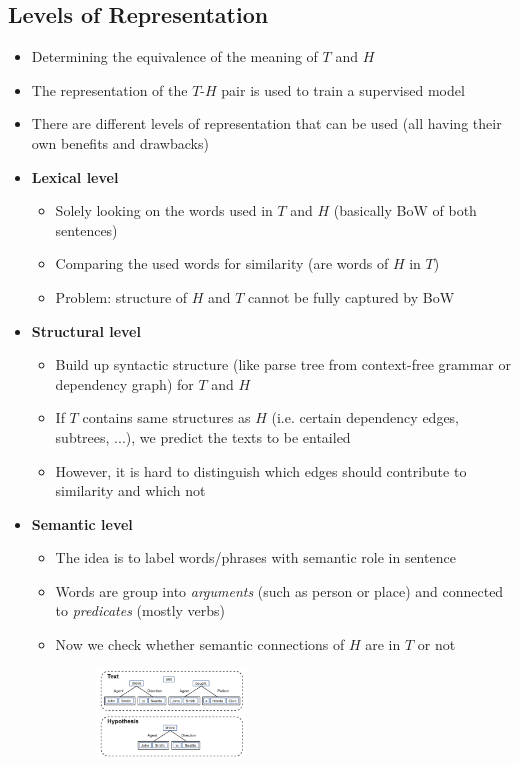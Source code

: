 \subsection{Levels of Representation}
\begin{itemize}
	\item Determining the equivalence of the meaning of $T$ and $H$
	\item The representation of the $T$-$H$ pair is used to train a supervised model
	\item There are different levels of representation that can be used (all having their own benefits and drawbacks)
	\item \textbf{Lexical level}
	\begin{itemize}
		\item Solely looking on the words used in $T$ and $H$ (basically BoW of both sentences)
		\item Comparing the used words for similarity (are words of $H$ in $T$)
		\item Problem: structure of $H$ and $T$ cannot be fully captured by BoW
	\end{itemize}
	\item \textbf{Structural level}
	\begin{itemize}
		\item Build up syntactic structure (like parse tree from context-free grammar or dependency graph) for $T$ and $H$
		\item If $T$ contains same structures as $H$ (i.e. certain dependency edges, subtrees, ...), we predict the texts to be entailed
		\item However, it is hard to distinguish which edges should contribute to similarity and which not 
	\end{itemize}
	\item \textbf{Semantic level}
	\begin{itemize}
		\item The idea is to label words/phrases with semantic role in sentence
		\item Words are group into \textit{arguments} (such as person or place) and connected to \textit{predicates} (mostly verbs)
		\item Now we check whether semantic connections of $H$ are in $T$ or not
		\begin{figure}[ht]
			\centering
			\includegraphics[width=0.4\textwidth]{figures/text_entailment_semantic_level.png}

\end{figure}
\end{itemize}
\end{itemize}
